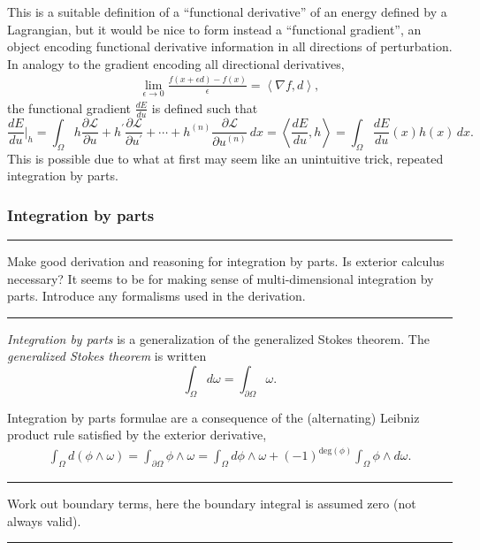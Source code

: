 \documentclass[11pt,a4paper]{memoir}
\newcommand{\inner}[1]{\left<#1\right>}
\newcommand{\fancyL}{\mathcal{L}}
\newcommand{\om}{\Omega}
\newcommand{\pom}{{\partial\Omega}}
\newcommand{\todo}[1]{\vskip 0.1in \hrule \vskip 0.03in {#1} \vskip 0.03in \hrule \vskip 0.1in}
\begin{document}
This is a suitable definition of a ``functional derivative'' of an energy defined by a Lagrangian,
but it would be nice to form instead a ``functional gradient'', an object encoding functional derivative information
in all directions of perturbation.
In analogy to the gradient encoding all directional derivatives,
\begin{align*}
    \lim_{\epsilon\rightarrow 0} \frac{f(x + \epsilon d) - f(x)}{\epsilon} = \inner{\nabla f, d},
\end{align*}
the functional gradient $\frac{dE}{du}$ is defined such that
    $$\frac{dE}{du}\Big|_h
    = \int_\Omega h\frac{\partial\mathcal{L}}{\partial u} + h^\prime\frac{\partial\fancyL}{\partial u^\prime} + \cdots + h^{(n)}\frac{\partial\fancyL}{\partial u^{(n)}}\,dx
     = \inner{\frac{dE}{du}, h} = \int_\Omega \frac{dE}{du}(x)h(x)\,dx.
$$
This is possible due to what at first may seem like an unintuitive trick, repeated integration by parts.



\subsubsection{Integration by parts}
\todo{Make good derivation and reasoning for integration by parts. Is exterior calculus necessary? It seems
to be for making sense of multi-dimensional integration by parts. Introduce any formalisms used in the derivation.}
\textit{Integration by parts} is a generalization of the generalized Stokes theorem.
The \textit{generalized Stokes theorem} is written
\begin{equation}\label{generalized_stokes}
    \int_\om d\omega = \int_\pom \omega.
\end{equation}

Integration by parts formulae are a consequence of the (alternating) Leibniz product rule satisfied by the exterior derivative,
\begin{align*}
    \int_\om d(\phi\wedge \omega) = \int_\pom \phi\wedge\omega
        = \int_\om d\phi \wedge \omega + (-1)^{\text{deg}(\phi)}\int_\om \phi \wedge d\omega.
\end{align*}

\todo{Work out boundary terms, here the boundary integral is assumed zero (not always valid).}
\end{document}
